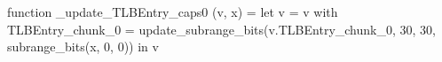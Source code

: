 function _update_TLBEntry_caps0 (v, x) = let v = { v with TLBEntry_chunk_0 = update_subrange_bits(v.TLBEntry_chunk_0, 30, 30, subrange_bits(x, 0, 0)) } in
  v

